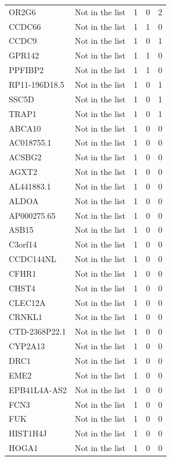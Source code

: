 \documentclass[12pt,twoside]{reedthesis}
\theoremstyle{definition}
\theoremstyle{definition}
\theoremstyle{remark}
\begin{document}
\begin{longtable}[t]{llrrr}
  OR2G6 & Not in the list & 1 & 0 & 2\\
  \addlinespace
  CCDC66 & Not in the list & 1 & 1 & 0\\
  CCDC9 & Not in the list & 1 & 0 & 1\\
  GPR142 & Not in the list & 1 & 1 & 0\\
  PPFIBP2 & Not in the list & 1 & 1 & 0\\
  RP11-196D18.5 & Not in the list & 1 & 0 & 1\\
  \addlinespace
  SSC5D & Not in the list & 1 & 0 & 1\\
  TRAP1 & Not in the list & 1 & 0 & 1\\
  ABCA10 & Not in the list & 1 & 0 & 0\\
  AC018755.1 & Not in the list & 1 & 0 & 0\\
  ACSBG2 & Not in the list & 1 & 0 & 0\\
  \addlinespace
  AGXT2 & Not in the list & 1 & 0 & 0\\
  AL441883.1 & Not in the list & 1 & 0 & 0\\
  ALDOA & Not in the list & 1 & 0 & 0\\
  AP000275.65 & Not in the list & 1 & 0 & 0\\
  ASB15 & Not in the list & 1 & 0 & 0\\
  \addlinespace
  C3orf14 & Not in the list & 1 & 0 & 0\\
  CCDC144NL & Not in the list & 1 & 0 & 0\\
  CFHR1 & Not in the list & 1 & 0 & 0\\
  CHST4 & Not in the list & 1 & 0 & 0\\
  CLEC12A & Not in the list & 1 & 0 & 0\\
  \addlinespace
  CRNKL1 & Not in the list & 1 & 0 & 0\\
  CTD-2368P22.1 & Not in the list & 1 & 0 & 0\\
  CYP2A13 & Not in the list & 1 & 0 & 0\\
  DRC1 & Not in the list & 1 & 0 & 0\\
  EME2 & Not in the list & 1 & 0 & 0\\
  \addlinespace
  EPB41L4A-AS2 & Not in the list & 1 & 0 & 0\\
  FCN3 & Not in the list & 1 & 0 & 0\\
  FUK & Not in the list & 1 & 0 & 0\\
  HIST1H4J & Not in the list & 1 & 0 & 0\\
  HOGA1 & Not in the list & 1 & 0 & 0\\

\end{longtable}
\end{document}
